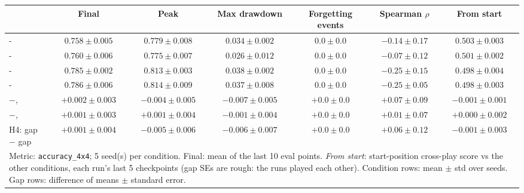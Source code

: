 \begin{tabular}{lcccccc}
\toprule
 & Final & Peak & Max drawdown & Forgetting events & Spearman $\rho$ & From start \\
\midrule
\envT{}-\naiveS{} & $0.758 \pm 0.005$ & $0.779 \pm 0.008$ & $0.034 \pm 0.002$ & $0.0 \pm 0.0$ & $-0.14 \pm 0.17$ & $0.503 \pm 0.003$ \\
\envT{}-\poolS{} & $0.760 \pm 0.006$ & $0.775 \pm 0.007$ & $0.026 \pm 0.012$ & $0.0 \pm 0.0$ & $-0.07 \pm 0.12$ & $0.501 \pm 0.002$ \\
\negT{}-\naiveS{} & $0.785 \pm 0.002$ & $0.813 \pm 0.003$ & $0.038 \pm 0.002$ & $0.0 \pm 0.0$ & $-0.25 \pm 0.15$ & $0.498 \pm 0.004$ \\
\negT{}-\poolS{} & $0.786 \pm 0.006$ & $0.814 \pm 0.009$ & $0.037 \pm 0.008$ & $0.0 \pm 0.0$ & $-0.25 \pm 0.05$ & $0.498 \pm 0.003$ \\
\midrule
\poolS{}$-$\naiveS{}, \envT{} & $+0.002 \pm 0.003$ & $-0.004 \pm 0.005$ & $-0.007 \pm 0.005$ & $+0.0 \pm 0.0$ & $+0.07 \pm 0.09$ & $-0.001 \pm 0.001$ \\
\poolS{}$-$\naiveS{}, \negT{} & $+0.001 \pm 0.003$ & $+0.001 \pm 0.004$ & $-0.001 \pm 0.004$ & $+0.0 \pm 0.0$ & $+0.01 \pm 0.07$ & $+0.000 \pm 0.002$ \\
H4: \envT{} gap $-$ \negT{} gap & $+0.001 \pm 0.004$ & $-0.005 \pm 0.006$ & $-0.006 \pm 0.007$ & $+0.0 \pm 0.0$ & $+0.06 \pm 0.12$ & $-0.001 \pm 0.003$ \\
\bottomrule
\multicolumn{7}{l}{\footnotesize Metric: \texttt{accuracy\_4x4}; 5 seed(s) per condition. Final: mean of the last 10 eval points. \emph{From start}: start-position cross-play score vs the other conditions, each run's last 5 checkpoints (gap SEs are rough: the runs played each other). Condition rows: mean $\pm$ std over seeds. Gap rows: difference of means $\pm$ standard error.}
\end{tabular}
